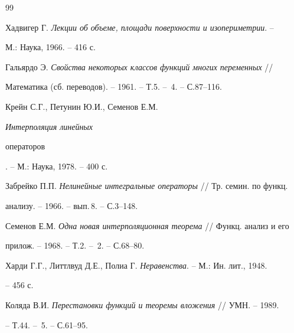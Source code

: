 \begin{thebibliography}{99} 


 




Хадвигер Г. {\em Лекции об объеме, площади поверхности и изопериметрии}. -- 


М.: Наука, 1966. -- 416 с. 


 




Гальярдо Э. {\em Свойства некоторых классов функций многих переменных} // 


Математика (сб. переводов). -- 1961. -- Т.5. -- \No\,4. -- С.87--116. 


 




Крейн С.Г., Петунин Ю.И., Семенов Е.М. {\em Интерполяция линейных 


операторов}. -- М.: Наука, 1978. -- 400 с. 


 




Забрейко П.П. {\em Нелинейные интегральные операторы} // Тр. семин. по функц. 


анализу. -- 1966. -- вып.\,8. -- С.3--148. 


 




Семенов Е.М. {\em Одна новая интерполяционная теорема} // Функц. анализ и его 


прилож. -- 1968. -- Т.2. -- \No\,2. -- С.68--80. 


 




Харди Г.Г., Литтлвуд Д.Е., Полиа Г. {\em Неравенства}. -- М.: Ин. лит., 1948. 


-- 456 с. 


 




Коляда В.И. {\em Перестановки функций и теоремы вложения} // УМН. -- 1989. 


-- Т.44. -- \No\,5. -- С.61--95. 


 





\end{thebibliography}
